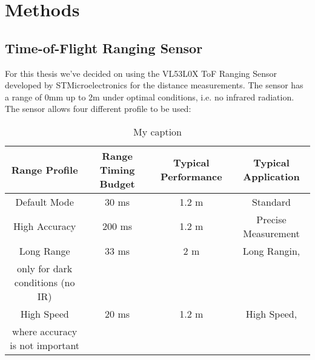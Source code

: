 \chapter{Methods}
\label{sec:evaluation}

\section{Time-of-Flight Ranging Sensor}
For this thesis we've decided on using the VL53L0X ToF Ranging Sensor developed by STMicroelectronics for the distance measurements. The sensor has a range of 0\unit{mm} up to 2\unit{m} under optimal conditions, i.e. no infrared radiation. The sensor allows four different profile to be used:\\
\begin{table}[]
\centering
\caption{My caption}
\label{my-label}
\begin{tabular}{@{}|c|c|c|c|@{}}
\toprule
\textbf{Range Profile} & \textbf{Range Timing Budget} & \textbf{Typical Performance} & \textbf{Typical Application}                  \\ \midrule
Default Mode           & 30 ms                        & 1.2 m                        & Standard                                      \\ \midrule
High Accuracy          & 200 ms                       & 1.2 m                        & Precise Measurement                           \\ \midrule
Long Range             & 33 ms                        & 2 m                          & Long Rangin, \\only for dark conditions (no IR) \\ \midrule
High Speed             & 20 ms                        & 1.2 m                        & High Speed, \\where accuracy is not important   \\ \bottomrule
\end{tabular}
\end{table}